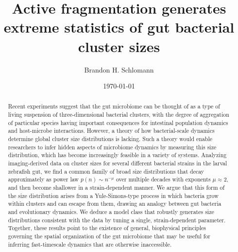 \documentclass[aps,pre,twocolumn]{revtex4-1}
\begin{document}
\title{Active fragmentation generates extreme statistics of gut bacterial cluster sizes}
\author{Brandon H. Schlomann}
\date{\today}


\begin{abstract}
	Recent experiments suggest that the gut microbiome can be thought of as a type of living suspension of three-dimensional bacterial clusters, with the degree of aggregation of particular species having important consequences for intestinal population dynamics and host-microbe interactions.  However, a theory of how bacterial-scale dynamics determine global cluster size distributions is lacking. Such a theory would enable researchers to infer hidden aspects of microbiome dynamics by measuring this size distribution, which has become increasingly feasible in a variety of systems. Analyzing imaging-derived data on cluster sizes for several different bacterial strains in the larval zebrafish gut, we find a common family of broad size distributions that decay approximately as power law $p(n)\sim n^{-\mu}$ over multiple decades with exponents $\mu\approx 2$, and then become shallower in a strain-dependent manner. We argue that this form of the size distribution arises from a Yule-Simons-type process in which bacteria grow within clusters and can escape from them, drawing an analogy between gut bacteria and evolutionary dynamics. We deduce a model class that robustly generates size distributions consistent with the data by tuning a single, strain-dependent parameter. Together, these results point to the existence of general, biophysical principles governing the spatial organization of the gut microbiome that may be useful for inferring fast-timescale dynamics that are otherwise inaccessible.  
\end{abstract}

\maketitle
\setlength\parskip{12pt}
\setlength\parindent{0pt}
\end{document}
